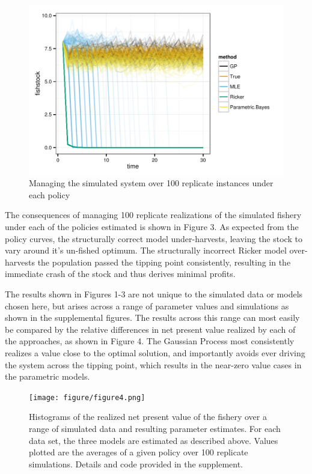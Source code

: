 \documentclass[author-year, review]{elsarticle} %
\makeatletter
\def\maxwidth{\ifdim\Gin@nat@width>\linewidth\linewidth
\else\Gin@nat@width\fi}
\let\Oldincludegraphics\includegraphics
\renewcommand{\includegraphics}[1]{\Oldincludegraphics[width=\maxwidth]{#1}}
\makeatother
\begin{document}
\begin{figure}[htbp]
\centering
\includegraphics{Figure3.pdf}
\caption{Managing the simulated system over 100 replicate instances
under each policy}
\end{figure}

The consequences of managing 100 replicate realizations of the simulated
fishery under each of the policies estimated is shown in Figure 3. As
expected from the policy curves, the structurally correct model
under-harvests, leaving the stock to vary around it's un-fished optimum.
The structurally incorrect Ricker model over-harvests the population
passed the tipping point consistently, resulting in the immediate crash
of the stock and thus derives minimal profits.

The results shown in Figures 1-3 are not unique to the simulated data or
models chosen here, but arises across a range of parameter values and
simulations as shown in the supplemental figures. The results across
this range can most easily be compared by the relative differences in
net present value realized by each of the approaches, as shown in Figure
4. The Gaussian Process most consistently realizes a value close to the
optimal solution, and importantly avoids ever driving the system across
the tipping point, which results in the near-zero value cases in the
parametric models.

\begin{figure}[htbp]
\centering
\texttt{[image: figure/figure4.png]}
\caption{Histograms of the realized net present value of the fishery
over a range of simulated data and resulting parameter estimates. For
each data set, the three models are estimated as described above. Values
plotted are the averages of a given policy over 100 replicate
simulations. Details and code provided in the supplement.}
\end{figure}
\end{document}
